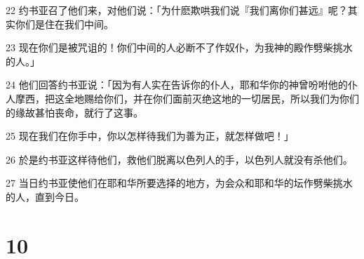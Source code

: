 \par 22 约书亚召了他们来，对他们说：「为什麽欺哄我们说『我们离你们甚远』呢？其实你们是住在我们中间。
\par 23 现在你们是被咒诅的！你们中间的人必断不了作奴仆，为我神的殿作劈柴挑水的人。」
\par 24 他们回答约书亚说：「因为有人实在告诉你的仆人，耶和华你的神曾吩咐他的仆人摩西，把这全地赐给你们，并在你们面前灭绝这地的一切居民，所以我们为你们的缘故甚怕丧命，就行了这事。
\par 25 现在我们在你手中，你以怎样待我们为善为正，就怎样做吧！」
\par 26 於是约书亚这样待他们，救他们脱离以色列人的手，以色列人就没有杀他们。
\par 27 当日约书亚使他们在耶和华所要选择的地方，为会众和耶和华的坛作劈柴挑水的人，直到今日。

\chapter{10}

